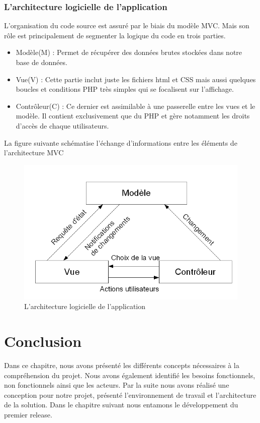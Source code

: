 \subsubsection{L'architecture  logicielle de l’application}
L’organisation du code source est assuré par le biais du modèle MVC. Mais son rôle est principalement de segmenter la logique du code en trois parties. 
\begin{itemize}
	\item Modèle(M) : Permet de récupérer des données brutes stockées dans notre base de données.
	\item Vue(V) : Cette partie inclut juste les fichiers html et CSS mais aussi quelques boucles et conditions PHP très simples qui se focalisent sur l’affichage. 
	\item Contrôleur(C) : Ce dernier est assimilable à une passerelle entre les vues et le modèle. Il contient exclusivement que du PHP et gère notamment les droits d’accès de chaque utilisateurs. 
\end{itemize}
La figure suivante schématise l’échange d’informations entre les éléments de l’architecture MVC
\begin{figure}[H]
	\centering
	\includegraphics[width=0.7\linewidth]{img/mvc}
	\caption[L'architecture logicielle de l’application]{L'architecture logicielle de l’application}
	\label{fig:mvc}
\end{figure}

\section*{Conclusion}
Dans ce chapitre, nous avons présenté les différents concepts nécessaires à la compréhension du projet. Nous avons également identifié les besoins fonctionnels, non fonctionnels ainsi que les acteurs. Par la suite nous avons réalisé une conception pour notre projet, présenté l’environnement de travail et l’architecture de la solution. Dans le chapitre suivant nous entamons le développement du premier release.